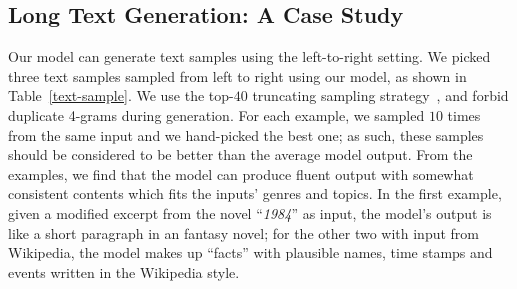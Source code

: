 \documentclass{article}
\begin{document}
\begin{appendices}

\section{Long Text Generation: A Case Study}

Our model can generate text samples using the left-to-right setting. We picked three text samples sampled from left to right using our model, as shown in Table~\ref{text-sample}. We use the top-$40$ truncating sampling strategy~\cite{gpt2}, and forbid duplicate 4-grams during generation. For each example, we sampled $10$ times from the same input and we hand-picked the best one; as such, these samples should be considered to be better than the average model output. From the examples, we find that the model can produce fluent output with somewhat consistent contents which fits the inputs' genres and topics. In the first example, given a modified excerpt from the novel ``\textit{1984}'' as input, the model's output is like a short paragraph in an fantasy novel; for the other two with input from Wikipedia, the model makes up ``facts'' with plausible names, time stamps and events written in the Wikipedia style.


\end{appendices}
\end{document}
